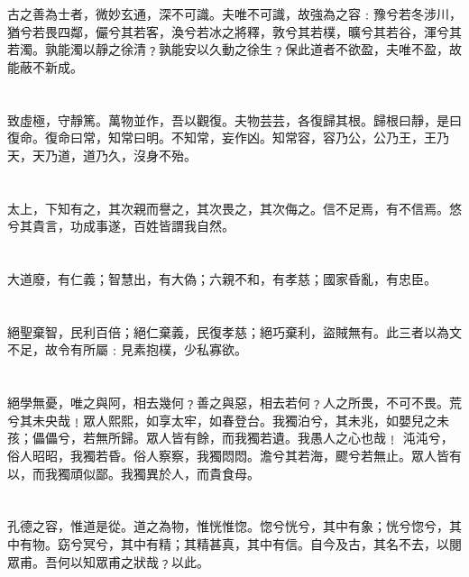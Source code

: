 \documentclass[11pt,oneside]{article}
\begin{document}
\section{}
\label{sec:orgheadline15}
古之善為士者，微妙玄通，深不可識。夫唯不可識，故強為之容﹕豫兮若冬涉川，猶兮若畏四鄰，儼兮其若客，渙兮若冰之將釋，敦兮其若樸，曠兮其若谷，渾兮其若濁。孰能濁以靜之徐清﹖孰能安以久動之徐生﹖保此道者不欲盈，夫唯不盈，故能蔽不新成。

\section{}
\label{sec:orgheadline16}
致虛極，守靜篤。萬物並作，吾以觀復。夫物芸芸，各復歸其根。歸根曰靜，是曰復命。復命曰常，知常曰明。不知常，妄作凶。知常容，容乃公，公乃王，王乃天，天乃道，道乃久，沒身不殆。

\section{}
\label{sec:orgheadline17}
太上，下知有之，其次親而譽之，其次畏之，其次侮之。信不足焉，有不信焉。悠兮其貴言，功成事遂，百姓皆謂我自然。

\section{}
\label{sec:orgheadline18}
大道廢，有仁義；智慧出，有大偽；六親不和，有孝慈；國家昏亂，有忠臣。

\section{}
\label{sec:orgheadline19}
絕聖棄智，民利百倍；絕仁棄義，民復孝慈；絕巧棄利，盜賊無有。此三者以為文不足，故令有所屬﹕見素抱樸，少私寡欲。

\section{}
\label{sec:orgheadline20}
絕學無憂，唯之與阿，相去幾何﹖善之與惡，相去若何﹖人之所畏，不可不畏。荒兮其未央哉﹗眾人熙熙，如享太牢，如春登台。我獨泊兮，其未兆，如嬰兒之未孩；儡儡兮，若無所歸。眾人皆有餘，而我獨若遺。我愚人之心也哉﹗ 沌沌兮，俗人昭昭，我獨若昏。俗人察察，我獨悶悶。澹兮其若海，飂兮若無止。眾人皆有以，而我獨頑似鄙。我獨異於人，而貴食母。

\section{}
\label{sec:orgheadline21}
孔德之容，惟道是從。道之為物，惟恍惟惚。惚兮恍兮，其中有象；恍兮惚兮，其中有物。窈兮冥兮，其中有精；其精甚真，其中有信。自今及古，其名不去，以閱眾甫。吾何以知眾甫之狀哉﹖以此。
\end{document}
